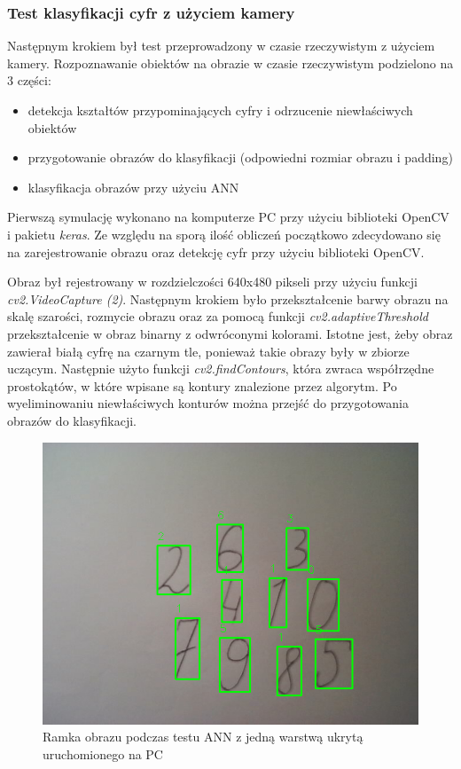 \subsubsection{Test klasyfikacji cyfr z użyciem kamery}

Następnym krokiem był test przeprowadzony w czasie rzeczywistym z użyciem kamery. Rozpoznawanie obiektów na obrazie w czasie rzeczywistym podzielono na 3 części:
\begin{itemize}
    \item detekcja kształtów przypominających cyfry i odrzucenie niewłaściwych obiektów
    \item przygotowanie obrazów do klasyfikacji (odpowiedni rozmiar obrazu i padding)
    \item klasyfikacja obrazów przy użyciu ANN
\end{itemize}

Pierwszą symulację wykonano na komputerze PC przy użyciu biblioteki OpenCV i pakietu \emph{keras}.
Ze względu na sporą ilość obliczeń początkowo zdecydowano się na zarejestrowanie obrazu oraz 
detekcję cyfr przy użyciu biblioteki OpenCV. 

Obraz był rejestrowany w rozdzielczości 640x480 pikseli przy użyciu funkcji \emph{cv2.VideoCapture
(2)}. Następnym krokiem było przekształcenie barwy obrazu na skalę szarości, rozmycie obrazu oraz 
za pomocą funkcji \emph{cv2.adaptiveThreshold} przekształcenie w obraz binarny z odwróconymi 
kolorami. Istotne jest, żeby obraz zawierał białą cyfrę na czarnym tle, ponieważ takie obrazy były 
w zbiorze uczącym.  Następnie użyto funkcji \emph{cv2.findContours}, która zwraca współrzędne 
prostokątów, w które wpisane są kontury znalezione przez algorytm. Po wyeliminowaniu niewłaściwych 
konturów można przejść do przygotowania obrazów do klasyfikacji. 

\begin{figure}[!h]
    \centering
    \includegraphics[width=\textwidth]{img/1hid-layer-pc-img.png}
    \caption{Ramka obrazu podczas testu ANN z jedną warstwą ukrytą uruchomionego na PC}
    \label{1hid-layer-pc-img}
  \end{figure}

